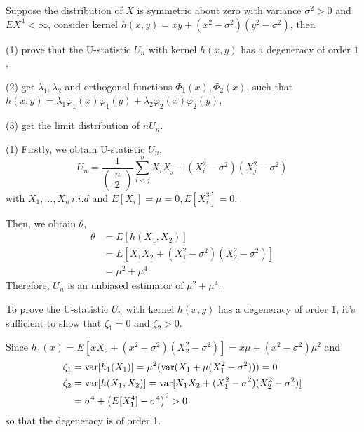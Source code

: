 \begin{problem}
    Suppose the distribution of $X$ is symmetric about zero with variance $\sigma^2>0$ and $EX^4 < \infty$, consider kernel $h(x,y)=xy+(x^2-\sigma^2)(y^2-\sigma^2)$, then

(1) prove that the U-statistic $U_n$ with kernel $h(x,y)$ has a degeneracy of order $1$,

(2) get $\lambda_1, \lambda_2$ and orthogonal functions $\Phi_1(x), \Phi_2(x)$, such that $h(x,y)=\lambda_1\varphi_1(x)\varphi_1(y)+\lambda_2\varphi_2(x)\varphi_2(y)$,

(3) get the limit distribution of $n U_n$.
\end{problem}


\begin{solution}
(1)
Firstly, we obtain U-statistic $U_n$,
\begin{equation*}
    U_n = \frac{1}{\left(\begin{matrix} n \\ 2  \end{matrix}\right)} \sum_{i<j}^n X_iX_j + (X_i^2-\sigma^2)(X_j^2-\sigma^2)
\end{equation*}
with $X_1, \dots,X_n\, i.i.d$  and $E[X_i]=\mu=0, E[X_i^3]=0$.

Then, we obtain $\theta$,
\begin{equation*}
    \begin{split}
        \theta & = E[h(X_1, X_2)]  \\
        & = E [ X_1X_2 + (X_1^2-\sigma^2)(X_2^2-\sigma^2) ] \\
        & = \mu^2 + \mu^4.
    \end{split}
\end{equation*}
Therefore, $U_n$ is an unbiased estimator of $\mu^2 + \mu^4$.

To prove the U-statistic $U_n$ with kernel $h(x,y)$ has a degeneracy of order $1$, it's sufficient to show that $\zeta_1=0$ and $\zeta_2> 0$.

Since $h_1(x) = E[xX_2 + (x^2-\sigma^2)(X_2^2-\sigma^2)] = x\mu + (x^2-\sigma^2)\mu^2$ and
\begin{equation*}
    \begin{split}
        \zeta_1 & = \mathrm{var}[h_1(X_1)] = \mu^2 (\mathrm{var}(X_1 + \mu(X_1^2-\sigma^2))) = 0 \\
        \zeta_2 & = \mathrm{var}[h(X_1, X_2)] = \mathrm{var}[X_1X_2 + (X_1^2-\sigma^2)(X_2^2-\sigma^2)] \\
        & = \sigma^4 + \left( E[X_1^4] - \sigma^4 \right)^2 > 0 
    \end{split}
\end{equation*}
so that the degeneracy is of order 1.


\end{solution}
